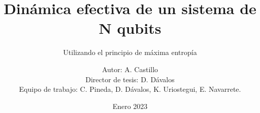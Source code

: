 \documentclass{mybeamer}
\title{Dinámica efectiva de un sistema de N qubits}
\subtitle{Utilizando el principio de máxima entropía}
\author[A. Castillo Guerrero]{Autor: A. Castillo\\ Director de tesis: D. Dávalos\\ Equipo de trabajo: C. Pineda, D. Dávalos, K. Uriostegui, E. Navarrete.}
\date{Enero 2023}
\institute[Facultad de Ciencias, UNAM]{Facultad de Ciencias, UNAM}
\begin{document}
\maketitle

\cutoc






%
\end{document}
